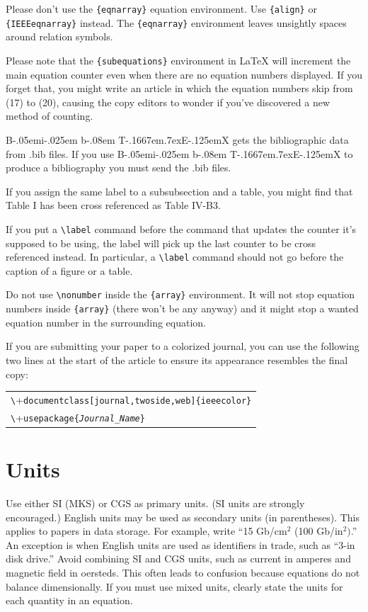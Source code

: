 \documentclass[journal,twoside,web]{ieeecolor}
\def\BibTeX{{\rm B\kern-.05em{\sc i\kern-.025em b}\kern-.08em
    T\kern-.1667em\lower.7ex\hbox{E}\kern-.125emX}}
\begin{document}
Please don't use the \verb|{eqnarray}| equation environment. Use
\verb|{align}| or \verb|{IEEEeqnarray}| instead. The \verb|{eqnarray}|
environment leaves unsightly spaces around relation symbols.

Please note that the \verb|{subequations}| environment in {\LaTeX}
will increment the main equation counter even when there are no
equation numbers displayed. If you forget that, you might write an
article in which the equation numbers skip from (17) to (20), causing
the copy editors to wonder if you've discovered a new method of
counting.

{\BibTeX} gets the bibliographic
data from .bib files. If you use {\BibTeX} to produce a
bibliography you must send the .bib files. 

If you assign the same label to a
subsubsection and a table, you might find that Table I has been cross
referenced as Table IV-B3. 

If you put a
\verb|\label| command before the command that updates the counter it's
supposed to be using, the label will pick up the last counter to be
cross referenced instead. In particular, a \verb|\label| command
should not go before the caption of a figure or a table.

Do not use \verb|\nonumber| inside the \verb|{array}| environment. It
will not stop equation numbers inside \verb|{array}| (there won't be
any anyway) and it might stop a wanted equation number in the
surrounding equation.

If you are submitting your paper to a colorized journal, you can use
the following two lines at the start of the article to ensure its
appearance resembles the final copy:

\smallskip\noindent
\begin{small}
\begin{tabular}{l}
\verb+\+\texttt{documentclass[journal,twoside,web]\{ieeecolor\}}\\
\verb+\+\texttt{usepackage\{\textit{Journal\_Name}\}}
\end{tabular}
\end{small}

\section{Units}
Use either SI (MKS) or CGS as primary units. (SI units are strongly 
encouraged.) English units may be used as secondary units (in parentheses). 
This applies to papers in data storage. For example, write ``15 
Gb/cm$^{2}$ (100 Gb/in$^{2})$.'' An exception is when 
English units are used as identifiers in trade, such as ``3\textonehalf-in 
disk drive.'' Avoid combining SI and CGS units, such as current in amperes 
and magnetic field in oersteds. This often leads to confusion because 
equations do not balance dimensionally. If you must use mixed units, clearly 
state the units for each quantity in an equation.
\end{document}
